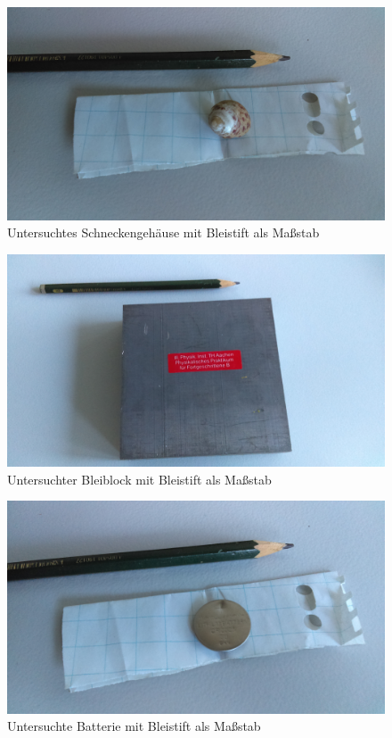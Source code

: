 \documentclass[a4paper,14pt]{article}
\begin{document}
\begin{figure}[H]
\centering
\includegraphics[width=\textwidth]{../Photos/Schnecke.jpg}
\caption{Untersuchtes Schneckengehäuse mit Bleistift als Maßstab}
\label{Schnecke}
\end{figure}

\begin{figure}[H]
\centering
\includegraphics[width=\textwidth]{../Photos/Blei.jpg}
\caption{Untersuchter Bleiblock mit Bleistift als Maßstab}
\label{Blei}
\end{figure}

\begin{figure}[H]
\centering
\includegraphics[width=\textwidth]{../Photos/Batterie.jpg}
\caption{Untersuchte Batterie mit Bleistift als Maßstab}
\label{Batterie}
\end{figure}
\end{document}
